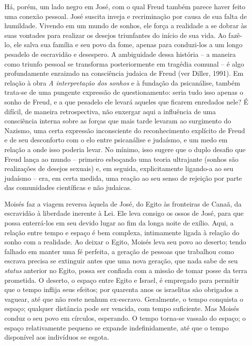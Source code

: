 Há, porém, um lado negro em José, com o qual Freud também parece haver
feito uma conexão pessoal. José suscita inveja e recriminação por causa
de sua falta de humildade. Vivendo em um mundo de sonhos, ele força a
realidade a se dobrar às suas vontades para realizar os desejos
triunfantes do início de sua vida. Ao fazê-lo, ele salva sua família e
seu povo da fome, apenas para conduzi-los a um longo pesadelo de
escravidão e desespero. A ambiguidade dessa história -- a maneira como
triunfo pessoal se transforma posteriormente em tragédia comunal -- é
algo profundamente enraizado na consciência judaica de Freud (ver
Diller, 1991). Em relação à obra \emph{A interpretação dos sonhos} e à
fundação da psicanálise, também trata-se de uma pungente expressão de
questionamento: seria tudo isso apenas o sonho de Freud, e a que
pesadelo ele levará aqueles que ficarem enredados nele? É difícil, de
maneira retrospectiva, não enxergar aqui a influência de uma consciência
interna sobre as forças que mais tarde levaram ao surgimento do Nazismo,
uma certa expressão inconsciente do reconhecimento explícito de Freud e
de seu desconforto com o elo entre psicanálise e judaísmo, e um medo em
relação a onde isso poderia levar. No mínimo, isso sugere que o duplo
desafio que Freud lança ao mundo -- primeiro esboçando uma teoria
ultrajante (sonhos são realizações de desejos sexuais) e, em seguida,
explicitamente ligando-a ao seu judaísmo -- era, em certa medida, uma
reação ao seu senso de rejeição por parte das comunidades científicas e
não judaicas.

Moisés faz a viagem reversa àquela de José, do Egito às fronteiras de
Canaã, da escravidão à liberdade inerente à Lei. Ele leva consigo os
ossos de José, para que possa enterrá-los em seu devido lugar ao fim da
longa noite de exílio. Aqui, a relação entre tempo e espaço é bem
complexa, intimamente ligada à relação do sonho com a realidade. Ao
deixar o Egito, Moisés leva seu povo ao deserto; tendo falhado em manter
uma fé perfeita, a geração de pessoas que trabalhou como escrava precisa
se extinguir antes que uma nova geração, que nada sabe de seu
\emph{status} anterior no Egito, possa ser confiada com a missão de
tomar posse da terra prometida. O deserto, o espaço entre Egito e
Israel, é empregado para permitir que o tempo inflija seus efeitos; por
quarenta anos os israelitas são obrigados a vaguear, até que não reste
nenhum ex-escravo. Geralmente, o tempo conquista o espaço; qualquer
distância pode ser vencida, com tempo suficiente. Mas Moisés conduz o
seu povo em círculos, esperando. O tempo torna-se vassalo do espaço; o
espaço relativamente pequeno se expande indefinidamente, até que o tempo
disponível aos indivíduos se esgota.


